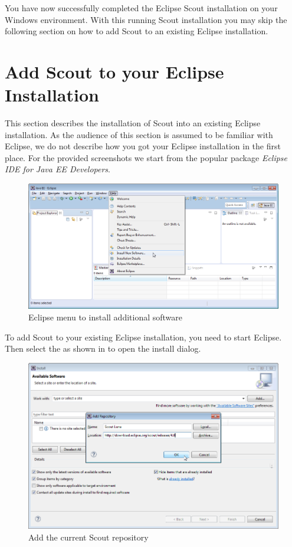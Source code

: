 \documentclass[a4paper,10pt,twoside]{book}
\begin{document}
You have now successfully completed the Eclipse Scout installation on your Windows environment.
With this running Scout installation you may skip the following section on how to add Scout to an existing Eclipse installation.

\section{Add Scout to your Eclipse Installation}

This section describes the installation of Scout into an existing Eclipse installation.
As the audience of this section is assumed to be familiar with Eclipse, we do not describe how you got your Eclipse installation in the first place.
For the provided screenshots we start from the popular package \textit{Eclipse IDE for Java EE Developers}.

\begin{figure}
\includegraphics[width=13cm]{eclipse_install_new_software.png}
\caption{Eclipse menu to install additional software}
\end{figure}

To add Scout to your existing Eclipse installation, you need to start Eclipse.
Then select the  as shown in  to open the install dialog.

\begin{figure}
\includegraphics[width=13cm]{eclipse_add_repository.png}
\caption{Add the current Scout repository}
\end{figure}
\end{document}
